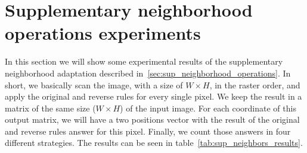 \section{Supplementary neighborhood operations experiments}
\label{sec:sno_experiments}
In this section we will show some experimental results of the supplementary neighborhood adaptation described in~\ref{sec:sup_neighborhood_operations}. In short, we basically scan the image, with a size of $W \times H$, in the raster order, and apply the original and reverse rules for every single pixel. We keep the result in a matrix of the same size ($W \times H$) of the input image. For each coordinate of this output matrix, we will have a two positions vector with the result of the original and reverse rules answer for this pixel. Finally, we count those answers in four different strategies. The results can be seen in table~\ref{tab:sup_neighbors_results}.

